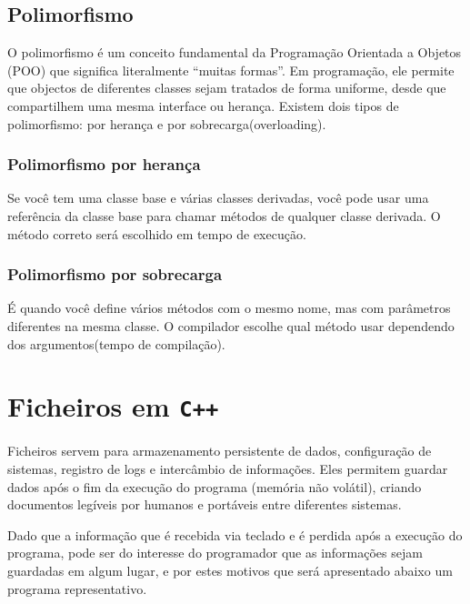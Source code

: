 \documentclass[a4paper,12pt]{article}
\begin{document}
\subsection{Polimorfismo}
O polimorfismo é um conceito fundamental da Programação Orientada a Objetos (POO) 
que significa literalmente “muitas formas”. Em programação, ele permite que objectos de 
diferentes classes sejam tratados de forma uniforme, 
desde que compartilhem uma mesma interface ou herança. Existem dois tipos de polimorfismo:
 por herança e por sobrecarga(overloading).

\subsubsection{Polimorfismo por herança}
Se você tem uma classe base e várias classes derivadas, você pode usar uma referência da classe 
base para chamar métodos de qualquer classe derivada. O método correto será escolhido em tempo de execução.

\subsubsection{Polimorfismo por sobrecarga}
É quando você define vários métodos com o mesmo nome, mas com parâmetros diferentes na mesma classe. 
O compilador escolhe qual método usar dependendo dos argumentos(tempo de compilação).

\newpage
\section{Ficheiros em \texttt{C++}}
 Ficheiros servem para armazenamento persistente de dados,
 configuração de sistemas, registro de logs e intercâmbio de informações. Eles permitem guardar dados
  após o fim da execução do programa (memória não volátil), criando documentos legíveis por humanos e 
  portáveis entre diferentes sistemas.
  
  Dado que a informação que é recebida via teclado e é perdida após 
  a execução do programa, pode ser do interesse do programador que as informações sejam guardadas em algum
  lugar, e por estes motivos que será apresentado abaixo um programa representativo. 
  
\end{document}
